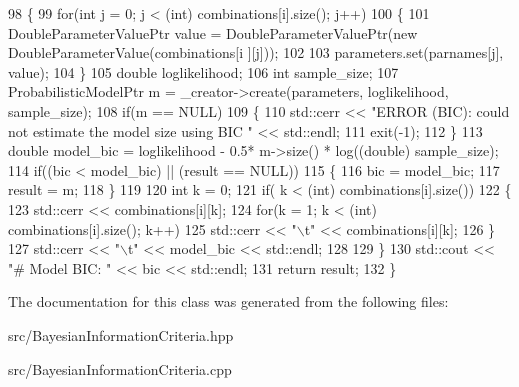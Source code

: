 \begin{DoxyCode}
98       \{
99         \textcolor{keywordflow}{for}(\textcolor{keywordtype}{int} j = 0; j < (int) combinations[i].size(); j++)
100           \{
101             DoubleParameterValuePtr value = DoubleParameterValuePtr(\textcolor{keyword}{new} DoubleParameterValue(combinations[i
      ][j]));
102 
103             parameters.set(parnames[j], value);
104           \}
105         \textcolor{keywordtype}{double} loglikelihood;
106         \textcolor{keywordtype}{int} sample\_size;
107         ProbabilisticModelPtr m = \_creator->create(parameters, loglikelihood, sample\_size);
108         \textcolor{keywordflow}{if}(m == NULL)
109             \{
110                 std::cerr << \textcolor{stringliteral}{"ERROR (BIC): could not estimate the model size using BIC "} << std::endl;
111                 exit(-1);
112             \}
113         \textcolor{keywordtype}{double} model\_bic =  loglikelihood  - 0.5* m->size() * log((\textcolor{keywordtype}{double}) sample\_size);
114         \textcolor{keywordflow}{if}((bic < model\_bic) || (result == NULL))
115           \{
116             bic = model\_bic;
117             result = m;
118           \}
119 
120         \textcolor{keywordtype}{int} k = 0;
121         \textcolor{keywordflow}{if}( k < (\textcolor{keywordtype}{int}) combinations[i].size())
122           \{
123             std::cerr << combinations[i][k];
124             \textcolor{keywordflow}{for}(k = 1; k < (int) combinations[i].size(); k++)
125               std::cerr << \textcolor{stringliteral}{"\(\backslash\)t"} << combinations[i][k];
126           \}
127         std::cerr << \textcolor{stringliteral}{"\(\backslash\)t"} << model\_bic  << std::endl;
128 
129       \}
130     std::cout << \textcolor{stringliteral}{"# Model BIC: "} << bic  << std::endl;
131     \textcolor{keywordflow}{return} result;
132   \}
\end{DoxyCode}


The documentation for this class was generated from the following files\+:\begin{DoxyCompactItemize}
\item 
src/Bayesian\+Information\+Criteria.\+hpp\item 
src/Bayesian\+Information\+Criteria.\+cpp\end{DoxyCompactItemize}
